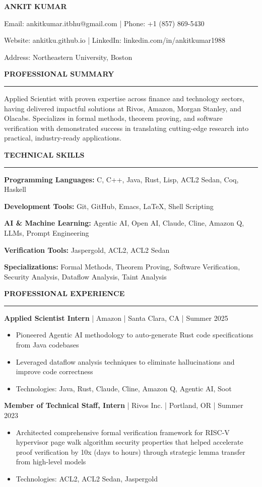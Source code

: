 \documentclass[11pt,letterpaper]{article}
\newcommand{\cvsection}[1]{
    \vspace{0.5em}
    \textbf{\large #1}
    \vspace{0.2em}
    \hrule
    \vspace{0.3em}
}
\newcommand{\cventry}[6]{
    \textbf{#1} | #2 | #3 | #4
    \vspace{0.1em}
    #6
    \vspace{0.3em}
}
\begin{document}
\begin{center}
    \textbf{\LARGE ANKIT KUMAR}
    \vspace{0.3em}

    Email: ankitkumar.itbhu@gmail.com | Phone: +1 (857) 869-5430

    Website: ankitku.github.io | LinkedIn: linkedin.com/in/ankitkumar1988

    Address: Northeastern University, Boston
\end{center}

\cvsection{PROFESSIONAL SUMMARY}
Applied Scientist with proven expertise across finance and technology sectors, having delivered impactful solutions at Rivos, Amazon, Morgan Stanley, and Olacabs. Specializes in formal methods, theorem proving, and software verification with demonstrated success in translating cutting-edge research into practical, industry-ready applications.

\cvsection{TECHNICAL SKILLS}
\textbf{Programming Languages:} C, C++, Java, Rust, Lisp, ACL2 Sedan, Coq, Haskell

\textbf{Development Tools:} Git, GitHub, Emacs, LaTeX, Shell Scripting

\textbf{AI \& Machine Learning:} Agentic AI, Open AI, Claude, Cline, Amazon Q, LLMs, Prompt Engineering

\textbf{Verification Tools:} Jaspergold, ACL2, ACL2 Sedan

\textbf{Specializations:} Formal Methods, Theorem Proving, Software Verification, Security Analysis, Dataflow Analysis, Taint Analysis

\cvsection{PROFESSIONAL EXPERIENCE}

\cventry{Applied Scientist Intern}{Amazon}{Santa Clara, CA}{Summer 2025}{}{
\begin{itemize}
    \item Pioneered Agentic AI methodology to auto-generate Rust code specifications from Java codebases
    \item Leveraged dataflow analysis techniques to eliminate hallucinations and improve code correctness
    \item Technologies: Java, Rust, Claude, Cline, Amazon Q, Agentic AI, Soot 
\end{itemize}
}

\cventry{Member of Technical Staff, Intern}{Rivos Inc.}{Portland, OR}{Summer 2023}{}{
\begin{itemize}
    \item Architected comprehensive formal verification framework for RISC-V hypervisor page walk algorithm security properties
    that helped accelerate proof verification by 10x (days to hours) through strategic lemma transfer from high-level models
    \item Technologies: ACL2, ACL2 Sedan, Jaspergold
\end{itemize}
}
\end{document}
